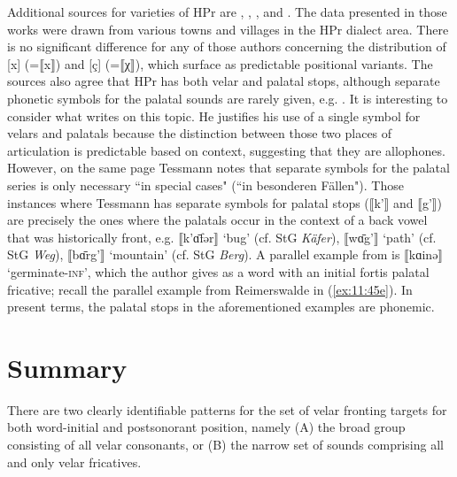 Additional sources for varieties of HPr are \citet{Stuhrmann1896}, \citet{Ziesemer1924}, \citet{Kuck1927, Kuck1933}, and \citet{Tessmann1969}. The data presented in those works were drawn from various towns and villages in the HPr dialect area. There is no significant difference for any of those authors concerning the distribution of [x] (=⟦x⟧) and [ç] (=⟦χ⟧), which surface as predictable positional variants. The sources also agree that HPr has both velar and palatal stops, although separate phonetic symbols for the palatal sounds are rarely given, e.g. \citet[123]{Ziesemer1924}. It is interesting to consider what \citet[116]{Tessmann1969} writes on this topic. He justifies his use of a single symbol for velars and palatals because the distinction between those two places of articulation is predictable based on context, suggesting that they are allophones. However, on the same page Tessmann notes that separate symbols for the palatal series is only necessary “in special cases" (“in besonderen Fällen"). Those instances where Tessmann has separate symbols for palatal stops (⟦k’⟧ and ⟦g’⟧) are precisely the ones where the palatals occur in the context of a back vowel that was historically front, e.g. ⟦k’ɑ̄fər⟧ ‘bug’ (cf. StG \textit{Käfer}), ⟦wɑ̄g’⟧ ‘path’ (cf. StG \textit{Weg}),  ⟦bɑ̄rg’⟧ ‘mountain’ (cf. StG \textit{Berg}). A parallel example from \citet{Ziesemer1924} is ⟦kɑinə⟧ ‘germinate-\textsc{inf}’, which the author gives as a word with an initial fortis palatal fricative; recall the parallel example from Reimerswalde in (\ref{ex:11:45e}). In present terms, the palatal stops in the aforementioned examples are phonemic.



\section{Summary}\label{sec:11.8}

There are two clearly identifiable patterns for the set of velar fronting targets for both word-initial and postsonorant position, namely (A) the broad group consisting of all velar consonants, or (B) the narrow set of sounds comprising all and only velar fricatives.

